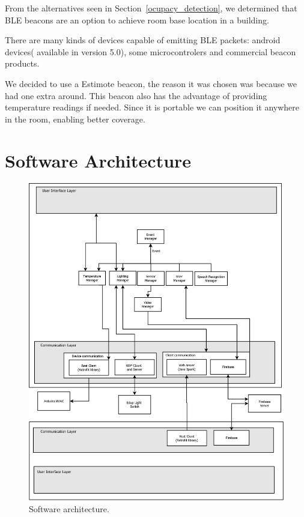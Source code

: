 From the alternatives seen in Section~\ref{ocupacy_detection}, we  determined that \ac{BLE} beacons are an option to achieve room base location in a building.

There are many kinds of devices capable of emitting \ac{BLE} packets: android devices( available in version 5.0), some microcontrolers and commercial beacon products.

We decided to use a Estimote beacon, the reason it was chosen was because we had one extra around. This beacon also has the advantage of providing temperature readings if needed. Since it is portable we can position it anywhere in the room, enabling better coverage.


\section{Software Architecture}


\begin{figure}[H]
\centering
\includegraphics[width=1\textwidth]{Figures/software_dia}
\caption{Software architecture.}
\label{screen_lights}
\end{figure}


